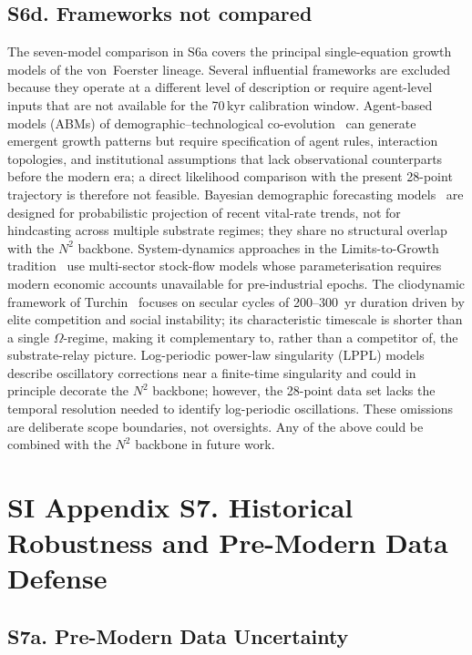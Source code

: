 \documentclass[11pt]{article}
\begin{document}
\subsection*{S6d. Frameworks not compared}

The seven-model comparison in S6a covers the principal single-equation growth models of the von~Foerster lineage. Several influential frameworks are excluded because they operate at a different level of description or require agent-level inputs that are not available for the 70\,kyr calibration window.
Agent-based models (ABMs) of demographic--technological co-evolution~\cite{Axtell2022} can generate emergent growth patterns but require specification of agent rules, interaction topologies, and institutional assumptions that lack observational counterparts before the modern era; a direct likelihood comparison with the present 28-point trajectory is therefore not feasible.
Bayesian demographic forecasting models~\cite{Raftery2012} are designed for probabilistic projection of recent vital-rate trends, not for hindcasting across multiple substrate regimes; they share no structural overlap with the $N^2$ backbone.
System-dynamics approaches in the Limits-to-Growth tradition~\cite{Meadows1972} use multi-sector stock-flow models whose parameterisation requires modern economic accounts unavailable for pre-industrial epochs.
The cliodynamic framework of Turchin~\cite{turchin2003} focuses on secular cycles of 200--300~yr duration driven by elite competition and social instability; its characteristic timescale is shorter than a single $\Omega$-regime, making it complementary to, rather than a competitor of, the substrate-relay picture.
Log-periodic power-law singularity (LPPL) models~\cite{Johansen2001} describe oscillatory corrections near a finite-time singularity and could in principle decorate the $N^2$ backbone; however, the 28-point data set lacks the temporal resolution needed to identify log-periodic oscillations.
These omissions are deliberate scope boundaries, not oversights. Any of the above could be combined with the $N^2$ backbone in future work.

\section*{SI Appendix S7. Historical Robustness and Pre-Modern Data Defense}
\label{sec:S7_historical}

\subsection*{S7a. Pre-Modern Data Uncertainty}
\end{document}
